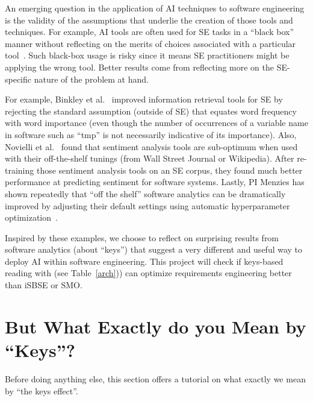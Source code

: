  An emerging question in the
application of AI techniques to software engineering is the validity
of the assumptions that underlie the creation of those tools and
techniques. 
For example, AI tools are
often used for SE tasks  in a ``black box'' manner without reflecting on the merits
of choices associated with a particular tool~\cite{Binkley:2018,Novielli:2018}. 
Such black-box usage is risky since it means SE practitioners
might be applying the wrong tool. Better results come from reflecting more on the SE-specific
nature of the problem at hand.

For example,
Binkley et al.~\cite{Binkley:2018} improved information  retrieval tools for SE
by rejecting the standard assumption (outside of SE) that
equates word frequency with word importance
(even though
the number of occurrences of a variable name in software such as ``tmp'' is not necessarily indicative of its importance).
Also, 
Novielli et al.~\cite{Novielli:2018} found that sentiment analysis tools are sub-optimum when used with their off-the-shelf tunings (from 
Wall Street Journal or Wikipedia).
 After re-training those sentiment analysis tools on an SE corpus, they found
much better performance at predicting sentiment for software systems.
Lastly,
PI  Menzies has shown repeatedly that ``off the shelf'' software
analytics can be
dramatically improved by adjusting their default settings using automatic hyperparameter optimization~\cite{fu2016tuning, agarwal17, Agrawal19}.

Inspired by these examples, we choose to reflect on surprising results
from software analytics (about ``keys'') that suggest a very different and useful way to deploy AI within software engineering.
This project will check if keys-based reading with {\IT} (see 
 Table~\ref{arch})) can optimize requirements engineering
better than iSBSE or SMO. 


 

\section{But What Exactly do you Mean by  ``Keys''?}\label{aboutkeys}

 Before  doing anything else,
this section offers a tutorial on what exactly we mean by ``the keys effect''.
     
